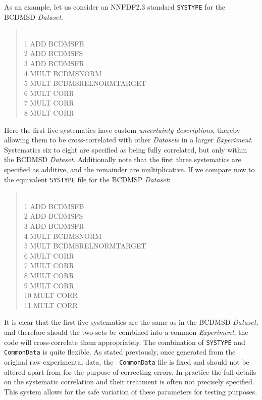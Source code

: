 \documentclass[11pt]{article}
\begin{document}
As an example, let us consider an NNPDF2.3 standard {\tt SYSTYPE} for the BCDMSD
\emph{Dataset}.
\begin{quotation}\\
1    ADD    BCDMSFB\\
2    ADD    BCDMSFS\\
3    ADD    BCDMSFR\\
4    MULT    BCDMSNORM\\
5    MULT    BCDMSRELNORMTARGET\\
6    MULT    CORR\\
7    MULT    CORR\\
8    MULT    CORR
\end{quotation}
Here the first five systematics have custom \emph{uncertainty descriptions},
thereby allowing them to be cross-correlated with other \emph{Datasets} in a
larger \emph{Experiment}. Systematics six to eight are specified as being fully
correlated, but only within the BCDMSD  \emph{Dataset}. Additionally note that
the first three systematics are specified as additive, and the remainder are
multiplicative. If we compare now to the equivalent {\tt SYSTYPE} file for the
BCDMSP \emph{Dataset}:
\begin{quotation}\\
1    ADD    BCDMSFB\\
2    ADD    BCDMSFS\\
3    ADD    BCDMSFR\\
4    MULT    BCDMSNORM\\
5    MULT    BCDMSRELNORMTARGET\\
6    MULT    CORR\\
7    MULT    CORR\\
8    MULT    CORR\\
9    MULT    CORR\\
10    MULT    CORR\\
11    MULT    CORR
\end{quotation}
It is clear that the first five systematics are the same as in the BCDMSD
\emph{Dataset}, and therefore should the two sets be combined into a common
\emph{Experiment}, the code will cross-correlate them appropriately. The
combination of {\tt SYSTYPE} and {\tt CommonData} is quite flexible. As stated
previously, once generated from the original raw experimental data, the {\tt
CommonData} file is fixed and should not be altered apart from for the purpose
of correcting errors. In practice the full details on the systematic correlation
and their treatment is often not precisely specified. This system allows for the
safe variation of these parameters for testing purposes.
\end{document}
